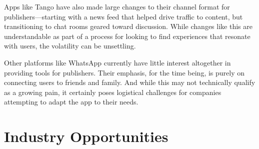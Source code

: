 \documentclass[notoc, symmetric, nobib, nols]{towcenter-guideto-book}
\begin{document}
\begin{enumerate}[itemsep=1em]
\hspace{2ex} Apps like Tango have also made large changes to their channel format for publishers---starting with a news feed that helped drive traffic to content, but transitioning to chat rooms geared toward discussion. While changes like this are understandable as part of a process for looking to find experiences that resonate with users, the volatility can be unsettling.   

\hspace{2ex} Other platforms like WhatsApp currently have little interest altogether in providing tools for publishers. Their emphasis, for the time being, is purely on connecting users to friends and family. And while this may not technically qualify as a growing pain, it certainly poses logistical challenges for companies attempting to adapt the app to their needs.
\end{enumerate}

\section{Industry Opportunities}
\end{document}
